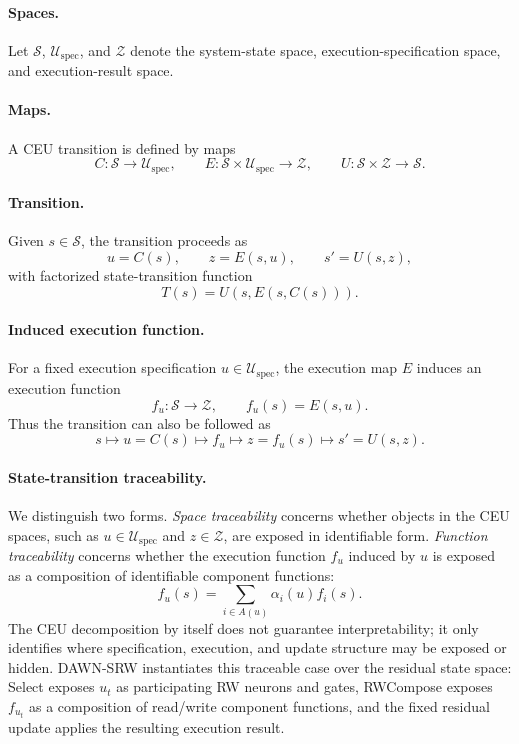 \documentclass{article}
\begin{document}
\paragraph{Spaces.}
Let $\mathcal{S}$, $\mathcal{U}_{\mathrm{spec}}$, and $\mathcal{Z}$ denote the system-state space, execution-specification space, and execution-result space.

\paragraph{Maps.}
A CEU transition is defined by maps
\[
C:\mathcal{S}\to\mathcal{U}_{\mathrm{spec}},\qquad
E:\mathcal{S}\times\mathcal{U}_{\mathrm{spec}}\to\mathcal{Z},\qquad
U:\mathcal{S}\times\mathcal{Z}\to\mathcal{S}.
\]

\paragraph{Transition.}
Given $s\in\mathcal{S}$, the transition proceeds as
\[
u=C(s),\qquad z=E(s,u),\qquad s'=U(s,z),
\]
with factorized state-transition function
\[
T(s)=U(s,E(s,C(s))).
\]

\paragraph{Induced execution function.}
For a fixed execution specification $u\in\mathcal{U}_{\mathrm{spec}}$, the execution map $E$ induces an execution function
\[
f_u:\mathcal{S}\to\mathcal{Z},\qquad f_u(s)=E(s,u).
\]
Thus the transition can also be followed as
\[
s\mapsto u=C(s)\mapsto f_u\mapsto z=f_u(s)\mapsto s'=U(s,z).
\]

\paragraph{State-transition traceability.}
We distinguish two forms. \emph{Space traceability} concerns whether objects in the CEU spaces, such as $u\in\mathcal{U}_{\mathrm{spec}}$ and $z\in\mathcal{Z}$, are exposed in identifiable form. \emph{Function traceability} concerns whether the execution function $f_u$ induced by $u$ is exposed as a composition of identifiable component functions:
\[
f_u(s)=\sum_{i\in A(u)}\alpha_i(u)f_i(s).
\]
The CEU decomposition by itself does not guarantee interpretability; it only identifies where specification, execution, and update structure may be exposed or hidden.
DAWN-SRW instantiates this traceable case over the residual state space: Select exposes $u_t$ as participating RW neurons and gates, RWCompose exposes $f_{u_t}$ as a composition of read/write component functions, and the fixed residual update applies the resulting execution result.
\end{document}
